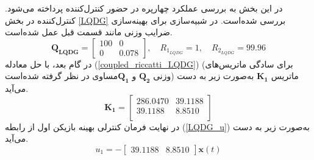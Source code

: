 در این بخش به بررسی عملکرد چهارپره در حضور کنترل‌کننده  پرداخته می‌شود. کنترل‌کننده  در بخش
\ref{LQDG}
بررسی شده‌است.
 در شبیه‌سازی برای بهینه‌سازی ضرایب وزنی مانند قسمت قبل عمل شده‌است.
\begin{equation}
	\boldsymbol{Q_{LQDG}} = \begin{bmatrix}
		100 & 0\\
		0 & 0.078
	\end{bmatrix}, \quad R_{1_{LQDG}} =  1, \quad R_{2_{LQDG}} =  99.96
\end{equation}
در گام بعد، با حل معادله
(\ref{coupled_riccatti_LQDG})
(برای سادگی ماتریس‌های وزنی $\boldsymbol{{Q}_{2}}$ و $\boldsymbol{{Q}_{1}}$مساوی در نظر گرفته شده‌است)
ماتریس
$\boldsymbol{{K}_1}$
به‌صورت زیر به دست می‌آید.
\begin{equation}
	\boldsymbol{K_1} = \begin{bmatrix}
		
		286.0470  & 39.1188\\
		39.1188   & 8.8510\\
	\end{bmatrix}
\end{equation}
در نهایت فرمان کنترلی بهینه بازیکن اول از رابطه
(\ref{LQDG_u})
به‌صورت زیر به دست می‌آید.
\begin{equation}
	u_1 = -\begin{bmatrix}
		39.1188   & 8.8510
	\end{bmatrix}\boldsymbol{x}(t)
\end{equation}

